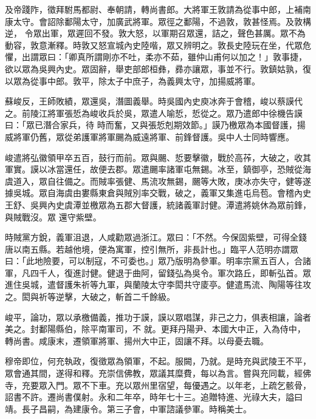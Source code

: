 \begin{pinyinscope}
 及帝踐阼，徵拜駙馬都尉、奉朝請，轉尚書郎。大將軍王敦請為從事中郎，上補南康太守。會詔除鄱陽太守，加廣武將軍。眾徑之鄱陽，不過敦，敦甚怪焉。及敦構逆，
 令眾出軍，眾遲回不發。敦大怒，以軍期召眾還，詰之，聲色甚厲。眾不為動容，敦意漸釋。時敦又怒宣城內史陸喈，眾又辨明之。敦長史陸玩在坐，代眾危懼，出謂眾曰：「卿真所謂剛亦不吐，柔亦不茹，雖仲山甫何以加之！」敦事捷，欲以眾為吳興內史。眾固辭，舉吏部郎桓彝，彞亦讓眾，事並不行。敦鎮姑孰，復以眾為從事中郎。敦平，除太子中庶子，為義興太守，加揚威將軍。



 蘇峻反，王師敗績，眾還吳，潛圖義舉。時吳國內史庾冰奔于會稽，峻以蔡謨代之。前陵江將軍張悊為峻收兵於吳，眾遣人喻悊，悊從之。眾乃遣郎中徐機告謨曰：「眾已潛合家兵，待
 時而奮，又與張悊剋期效節。」謨乃檄眾為本國督護，揚威將軍仍舊，眾從弟護軍將軍颺為威遠將軍、前鋒督護。吳中人士同時響應。



 峻遣將弘徽領甲卒五百，鼓行而前。眾與颺、悊要擊徽，戰於高莋，大破之，收其軍實。謨以冰當還任，故便去郡。眾遣颺率諸軍屯無錫。冰至，鎮御亭，恐賊從海虞道入，眾自往備之。而賊率張健、馬流攻無錫，颺等大敗，庚冰亦失守，健等遂據吳城。眾自海虞由婁縣東倉與賊別率交戰，破之，義軍又集進屯烏苞。會稽內史王舒、吳興內史虞潭並檄眾為五郡大督護，統諸義軍討健。潭遣將姚休為眾前鋒，與賊戰沒。眾
 還守紫壁。



 時賊黨方銳，義軍沮退，人咸勸眾過浙江。眾曰：「不然。今保固紫壁，可得全錢唐以南五縣。若越他境，便為寓軍，控引無所，非長計也。」臨平人范明亦謂眾曰：「此地險要，可以制寇，不可委也。」眾乃版明為參軍。明率宗黨五百人，合諸軍，凡四千人，復進討健。健退于曲阿，留錢弘為吳令。軍次路丘，即斬弘首。眾進住吳城，遣督護朱祈等九軍，與蘭陵太守李閎共守庱亭。健遣馬流、陶陽等往攻之。閎與祈等逆擊，大破之，斬首二千餘級。



 峻平，論功，眾以承檄備義，推功于謨，謨以眾唱謀，非己之力，俱表相讓，論者美之。封鄱陽縣伯，除平南軍司，不
 就。更拜丹陽尹、本國大中正，入為侍中，轉尚書。咸康末，遷領軍將軍、揚州大中正，固讓不拜。以母憂去職。



 穆帝即位，何充執政，復徵眾為領軍，不起。服闕，乃就。是時充與武陵王不平，眾會通其間，遂得和釋。充崇信佛教，眾議其糜費，每以為言。嘗與充同載，經佛寺，充要眾入門。眾不下車。充以眾州里宿望，每優遇之。以年老，上疏乞骸骨，詔書不許。遷尚書僕射。永和二年卒，時年七十三。追贈特進、光祿大夫，謚曰靖。長子昌嗣，為建康令。第三子會，中軍諮議參軍。時稱美士。




\end{pinyinscope}
